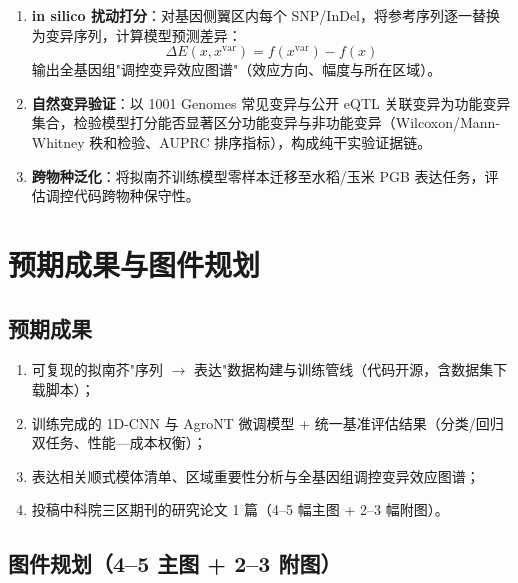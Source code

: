 \documentclass[UTF8,11pt,a4paper]{ctexart}
\begin{document}
\begin{enumerate}
\item \textbf{in silico 扰动打分}：对基因侧翼区内每个 SNP/InDel，将参考序列逐一替换为变异序列，计算模型预测差异：
\begin{equation}
\Delta E(x, x^{\mathrm{var}}) = f(x^{\mathrm{var}}) - f(x)
\end{equation}
输出全基因组"调控变异效应图谱"（效应方向、幅度与所在区域）。
\item \textbf{自然变异验证}：以 1001 Genomes 常见变异与公开 eQTL 关联变异为功能变异集合，检验模型打分能否显著区分功能变异与非功能变异（Wilcoxon/Mann-Whitney 秩和检验、AUPRC 排序指标），构成纯干实验证据链。
\item \textbf{跨物种泛化}：将拟南芥训练模型零样本迁移至水稻/玉米 PGB 表达任务，评估调控代码跨物种保守性。
\end{enumerate}

\section{预期成果与图件规划}
\label{sec:output}

\subsection{预期成果}
\label{sec:output-list}

\begin{enumerate}
\item 可复现的拟南芥"序列 $\rightarrow$ 表达"数据构建与训练管线（代码开源，含数据集下载脚本）；
\item 训练完成的 1D-CNN 与 AgroNT 微调模型 + 统一基准评估结果（分类/回归双任务、性能—成本权衡）；
\item 表达相关顺式模体清单、区域重要性分析与全基因组调控变异效应图谱；
\item 投稿中科院三区期刊的研究论文 1 篇（4--5 幅主图 + 2--3 幅附图）。
\end{enumerate}

\subsection{图件规划（4--5 主图 + 2--3 附图）}
\label{sec:output-figures}
\end{document}
